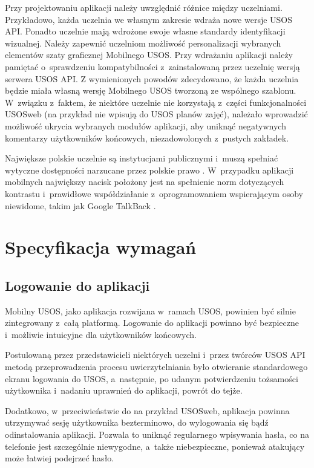 \documentclass{pracamgr}
\begin{document}
Przy projektowaniu aplikacji należy uwzględnić różnice między uczelniami.
Przykładowo, każda uczelnia we własnym zakresie wdraża nowe wersje USOS API.
Ponadto uczelnie mają wdrożone swoje własne standardy identyfikacji wizualnej.
Należy zapewnić uczelniom możliwość personalizacji wybranych elementów szaty
graficznej Mobilnego USOS. Przy wdrażaniu aplikacji należy pamiętać o~sprawdzeniu kompatybilności z~zainstalowaną przez uczelnię wersją serwera USOS API.
Z wymienionych powodów zdecydowano, że każda uczelnia będzie miała własną
wersję Mobilnego USOS tworzoną ze wspólnego szablonu. W~związku z~faktem, że
niektóre uczelnie nie korzystają z~części funkcjonalności USOSweb (na przykład nie
wpisują do USOS planów zajęć), należało wprowadzić możliwość ukrycia wybranych modułów aplikacji,
aby uniknąć negatywnych komentarzy użytkowników końcowych, niezadowolonych z~pustych zakładek.

Największe polskie uczelnie są instytucjami publicznymi i~muszą spełniać wytyczne
dostępności narzucane przez polskie prawo \cite{uodc}. W~przypadku aplikacji mobilnych
największy nacisk położony jest na spełnienie norm dotyczących kontrastu i~prawidłowe
współdziałanie z~oprogramowaniem wspierającym osoby niewidome, takim jak Google
TalkBack \cite{talkback}.

\chapter{Specyfikacja wymagań}
\label{sec:specyfikacja}

\section{Logowanie do aplikacji}

Mobilny USOS, jako aplikacja rozwijana w~ramach USOS, powinien być silnie 
zintegrowany z~całą platformą. Logowanie do aplikacji powinno być bezpieczne i~możliwie
intuicyjne dla użytkowników końcowych.

Postulowaną przez przedstawicieli niektórych uczelni i~przez twórców USOS API
metodą przeprowadzenia procesu uwierzytelniania było otwieranie standardowego ekranu
logowania do USOS, a~następnie, po udanym potwierdzeniu tożsamości użytkownika
i~nadaniu uprawnień do aplikacji, powrót do tejże.

Dodatkowo, w~przeciwieństwie do na przykład USOSweb, aplikacja powinna utrzymywać
sesję użytkownika bezterminowo, do wylogowania się bądź odinstalowania aplikacji.
Pozwala to uniknąć regularnego wpisywania hasła, co na telefonie jest szczególnie
niewygodne, a~także niebezpieczne, ponieważ atakujący może łatwiej podejrzeć hasło.
\end{document}
